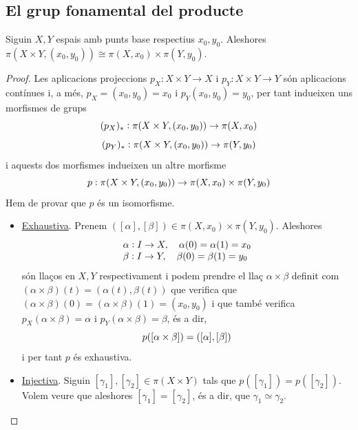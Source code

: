 \documentclass[../main.tex]{subfiles}
\begin{document}
\subsection{El grup fonamental del producte}

\begin{prop}
[Exercici 5ab]\label{exercici2.5.ab} Siguin $X,Y$ espais amb punts base respectius $x_0,y_0$. Aleshores $\pi(X\times Y,(x_0,y_0))\cong\pi(X,x_0)\times\pi(Y,y_0)$.
\end{prop}
\begin{proof}
Les aplicacions projeccions $p_X:X\times Y\rightarrow X$ i $p_Y:X\times Y\rightarrow Y$ són aplicacions contínues i, a més, $p_X=(x_0,y_0)=x_0$ i $p_Y(x_0,y_0) = y_0$, per tant indueixen uns morfismes de grups
\begin{equation}
    \notag
    (p_X)_*:\pi(X\times Y,(x_0,y_0))\rightarrow \pi(X,x_0)
\end{equation}
\begin{equation}
    \notag
    (p_Y)_*:\pi(X\times Y,(x_0,y_0))\rightarrow \pi(Y,y_0)
\end{equation}
i aquests dos morfismes indueixen un altre morfisme
\begin{equation}
    \notag
    p:\pi(X\times Y,(x_0,y_0))\rightarrow \pi(X,x_0)\times \pi(Y,y_0)
\end{equation}
Hem de provar que $p$ és un isomorfisme.
\begin{itemize}
    \item \underline{Exhaustiva}. Prenem $([\alpha],[\beta])\in\pi(X,x_0)\times\pi(Y,y_0)$. Aleshores
    \begin{equation}
        \notag
        \begin{array}{ll}
            \alpha:I\rightarrow X,\quad \alpha(0)=\alpha(1) = x_0 \\
            \beta:I\rightarrow Y,\quad \beta(0) = \beta(1) = y_0
        \end{array}
    \end{equation}
    són llaços en $X,Y$ respectivament i podem prendre el llaç $\alpha\times \beta$ definit com $(\alpha\times\beta)(t) = (\alpha(t),\beta(t))$ que verifica que $(\alpha\times\beta)(0)=(\alpha\times\beta)(1)=(x_0,y_0)$ i que també verifica $p_X(\alpha\times\beta)=\alpha$ i $p_Y(\alpha\times\beta)=\beta$, és a dir,
    \begin{equation}
        \notag
        p([\alpha\times\beta]) = ([\alpha],[\beta])
    \end{equation}
    i per tant $p$ és exhaustiva.
    \item \underline{Injectiva}. Siguin $[\gamma_1],[\gamma_2]\in\pi(X\times Y)$ tals que $p([\gamma_1])=p([\gamma_2])$. Volem veure que aleshores $[\gamma_1]=[\gamma_2]$, és a dir, que $\gamma_1\simeq \gamma_2$.
    

\end{itemize}
\end{proof}
\end{document}
